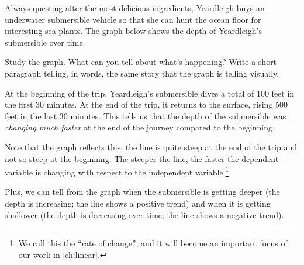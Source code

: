 \begin{boxexplore}
Always questing after the most delicious ingredients, Yeardleigh buys an underwater submersible vehicle so that she can hunt the ocean floor for interesting sea plants. The graph below shows the depth of Yeardleigh's submersible over time.

Study the graph. What can you tell about what's happening? Write a short paragraph telling, in words, the same story that the graph is telling visually.

\begin{center}
\end{center}
\end{boxexplore}


At the beginning of the trip, Yeardleigh's submersible dives a total of 100 feet in the first 30 minutes. At the end of the trip, it returns to the surface, rising 500 feet in the last 30 minutes. This tells us that the depth of the submersible was \textit{changing much faster} at the end of the journey compared to the beginning.

Note that the graph reflects this: the line is quite steep at the end of the trip and not so steep at the beginning. The steeper the line, the faster the dependent variable is changing with respect to the independent variable.\footnote{We call this the ``rate of change'', and it will become an important focus of our work in \cref{ch:linear}.}

Plus, we can tell from the graph when the submersible is getting deeper (the depth is increasing; the line shows a positive trend) and when it is getting shallower (the depth is decreasing over time; the line shows a negative trend).

